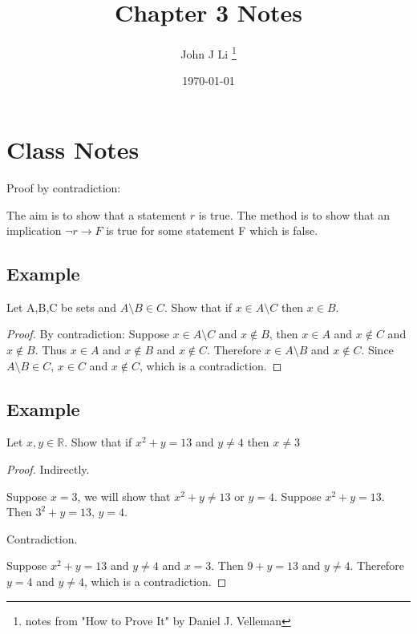 \documentclass[12pt, letterpaper]{article}
\title{Chapter 3 Notes}
\author{John J Li \thanks{notes from "How to Prove It" by Daniel J. Velleman}}
\date{\today}
\begin{document}

    \begin{titlepage}
        \maketitle
    \end{titlepage}


    \tableofcontents{}

    \newpage

    \section{Class Notes}

    Proof by contradiction:

    The aim is to show that a statement $r$ is true. The method is to show that an implication
    $\neg r \rightarrow F$ is true for some statement F which is false. 

    \subsection{Example}

    Let A,B,C be sets and $A \setminus B \in C$. Show that if $x \in A \setminus C$
    then $x \in B$. 

    \begin{proof}
        By contradiction: Suppose $x \in A \setminus C$ and $x \notin B$, then $x \in A$ and 
        $x \notin C$ and $x \notin B$. Thus $x \in A$ and $x \notin B$ and $x \notin C$. 
        Therefore $x \in A \setminus B$ and $x \notin C$. Since $A \setminus B \in C$, $x \in C$
        and $x \notin C$, which is a contradiction.
    \end{proof}

    \subsection{Example}

    Let $x,y \in \mathbb{R}$. Show that if $x^2 + y = 13$ and $y \neq 4$ then $x \neq 3$

    \begin{proof}
        Indirectly. 
        
        Suppose $x = 3$, we will show that $x^2 + y \neq 13$ or $y = 4$. 
        Suppose $x^2 + y = 13$. Then $3^2 + y = 13$, $y = 4$.

        Contradiction. 

        Suppose $x^2 + y = 13$ and $y \neq 4$ and $x = 3$. Then $9 + y = 13$ and $y\neq 4$.
        Therefore $y=4$ and $y\neq 4$, which is a contradiction. 
    \end{proof}
\end{document}
